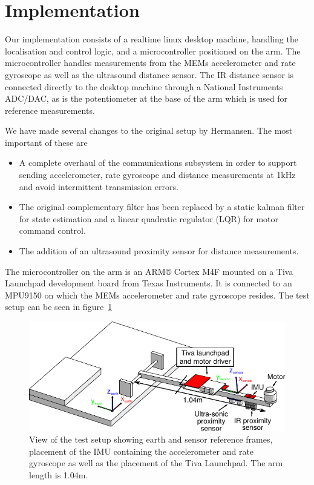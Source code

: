 \section{Implementation}\label{sec:implemenation}
Our implementation consists of a realtime linux desktop machine, handling the localisation and control logic, and a microcontroller
positioned on the arm. The microcontroller handles measurements from the MEMs accelerometer and rate gyroscope as well as the ultrasound
distance sensor. The IR distance sensor is connected directly to the desktop machine through a National Instruments ADC/DAC, as is the 
potentiometer at the base of the arm which is used for reference measurements.

We have made several changes to the original setup by Hermansen. The most important of these are

\begin{itemize}
		\item A complete overhaul of the communications subsystem in order to support sending accelerometer, rate gyroscope and 
			distance measurements at 1kHz and avoid intermittent transmission errors. 
		\item The original complementary filter has been replaced by a static kalman filter for state estimation and a linear 
			quadratic regulator (LQR)\cite{Hendricks2008} for motor command control.
			\item The addition of an ultrasound proximity sensor for distance measurements.
\end{itemize}

The microcontroller on the arm is an ARM® Cortex M4F mounted on a Tiva Launchpad development board from Texas Instruments.
It is connected to an MPU9150 on which the MEMs accelerometer and rate gyroscope resides.
The test setup can be seen in figure~\ref{fig:labsetup}
\begin{figure}
	\centering
	\includegraphics[width=\columnwidth]{pictures/arbejds_tegning}
	\caption{View of the test setup showing earth and sensor reference frames, placement of the IMU containing the 
	accelerometer and rate gyroscope as well as the placement of the Tiva Launchpad. The arm length is 1.04m.}
	\label{fig:labsetup}
\end{figure}

